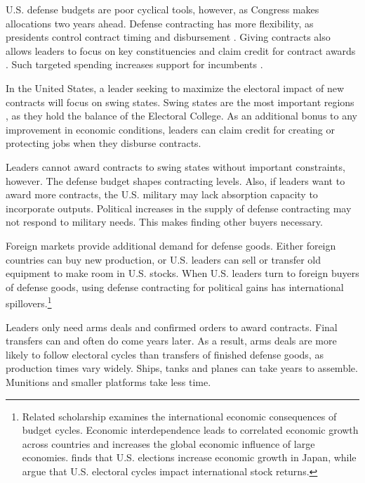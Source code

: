 \documentclass[12pt]{article}
\begin{document}
U.S. defense budgets are poor cyclical tools, however, as Congress makes allocations two years ahead.
Defense contracting has more flexibility, as presidents control contract timing and disbursement \citep{Mayer1995, DerouenHeo2000}.
Giving contracts also allows leaders to focus on key constituencies and claim credit for contract awards \citep{DerouenHeo2000}. 
Such targeted spending increases support for incumbents \citep{KrinerReeves2012}.


In the United States, a leader seeking to maximize the electoral impact of new contracts will focus on swing states.
Swing states are the most important regions \citep{KrinerReeves2015}, as they hold the balance of the Electoral College. 
As an additional bonus to any improvement in economic conditions, leaders can claim credit for creating or protecting jobs when they disburse contracts.


Leaders cannot award contracts to swing states without important constraints, however. 
The defense budget shapes contracting levels. 
Also, if leaders want to award more contracts, the U.S. military may lack absorption capacity to incorporate outputs.
Political increases in the supply of defense contracting may not respond to military needs.
This makes finding other buyers necessary.


Foreign markets provide additional demand for defense goods.
Either foreign countries can buy new production, or U.S. leaders can sell or transfer old equipment to make room in U.S. stocks. 
When U.S. leaders turn to foreign buyers of defense goods, using defense contracting for political gains has international spillovers.\footnote{%
Related scholarship examines the international economic consequences of budget cycles.
Economic interdependence leads to correlated economic growth across countries \citep{Kayser2006} and increases the global economic influence of large economies. 
\citet{Ito1991} finds that U.S. elections increase economic growth in Japan, while \citet{FoersterSchmitz1997} argue that U.S. electoral cycles impact international stock returns.
}


Leaders only need arms deals and confirmed orders to award contracts.
Final transfers can and often do come years later. 
As a result, arms deals are more likely to follow electoral cycles than transfers of finished defense goods, as production times vary widely. 
Ships, tanks and planes can take years to assemble.
Munitions and smaller platforms take less time. 
\end{document}
